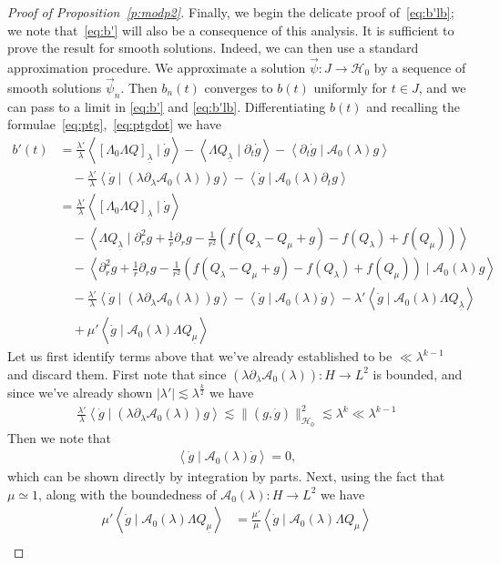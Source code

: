 \documentclass[10pt,reqno]{amsart}
\newcommand{\A}{\mathcal{A}}
\newcommand{\B}{\mathcal{B}}
\newcommand{\HH}{\mathcal{H}}
\newcommand{\la}{\lambda}
\newcommand{\La}{\Lambda}
\newcommand{\p}{\partial}
\newcommand{\ang}[1]{\left\langle{#1}\right\rangle}
\newcommand{\abs}[1]{\left\lvert{#1}\right\rvert}
\newcommand{\EQ}[1]{\begin{equation}\begin{split} #1 \end{split}\end{equation}}
\numberwithin{equation}{section}
\theoremstyle{remark}
\newcounter{parts}
\newcommand{\ula}{\underline{\lambda}}
\newcommand{\umu}{\underline{\mu}}
\newcommand{\0}{\emptyset}
\begin{document}
\begin{proof}[Proof of Proposition~\ref{p:modp2}]
Finally, we  begin the delicate proof of~\eqref{eq:b'lb}; we note that~\eqref{eq:b'} will also be a consequence of this analysis. It is sufficient to prove the result for smooth solutions.
Indeed, we can then use a standard approximation procedure.
We approximate a solution $\vec\psi:J\to \HH_0$ by a sequence of smooth solutions $\vec\psi_n$.
Then $b_n(t)$ converges to $b(t)$ uniformly for $t\in J$, and we can pass to a limit in \eqref{eq:b'} and \eqref{eq:b'lb}. Differentiating $b(t)$ and recalling the formulae~\eqref{eq:ptg},~\eqref{eq:ptgdot} we have 
\EQ{ \label{eq:b'1} 
b'(t) &= \frac{\la'}{\la} \ang{[ \La_0 \La Q]_{\ula} \mid \dot g }   - \ang{ \La Q_{\ula}  \mid \p_t \dot g} 
 - \ang{\p_t  \dot g \mid \A_0( \la) g}  \\ 
& \quad - \frac{\la'}{\la}\ang{ \dot g \mid  (\la \p_\la \A_0(\la)) g}  -  \ang{ \dot g \mid \A_0(\la) \p_t g} \\ 
& = \frac{\la'}{\la} \ang{[ \La_0 \La Q]_{\ula} \mid \dot g }   \\
 &\quad -  \ang{ \La Q_{\ula} \mid  \p_r^2 g + \frac{1}{r} \p_r g  - \frac{1}{r^2} \left( f( Q_\la - Q_\mu + g) - f(Q_\la) +f(Q_\mu)\right)} \\
& \quad - \ang{ \p_r^2 g + \frac{1}{r} \p_r g  - \frac{1}{r^2} \left( f( Q_\la - Q_\mu + g) - f(Q_\la) + f(Q_\mu)\right) \mid \A_0(\la) g}  \\
& \quad - \frac{\la'}{\la}\ang{ \dot g \mid  (\la \p_\la \A_0(\la)) g} - \ang{ \dot g \mid \A_0(\la) \dot g} -  \la' \ang{ \dot g \mid \A_0(\la) \La Q_{\ula}} \\
&\quad + \mu' \ang{ \dot g \mid \A_0(\la) \La Q_{\umu}}
}
Let us first identify terms above that we've already established to be $\ll \la^{k-1}$ and discard them. 
First note that since $(\la \p_\la \A_0(\la)): H \to L^2$ is bounded, and since we've already shown $\abs{\la'} \lesssim \la^{\frac{k}{2}}$ we have 
\EQ{
\frac{\la'}{\la}\ang{ \dot g \mid  (\la \p_\la \A_0(\la)) g} \lesssim  \|(g, \dot g) \|_{\HH_0}^2 \lesssim \la^k \ll \la^{k-1}
}
Then we note that 
\EQ{
\ang{ \dot g \mid \A_0(\la) \dot g} = 0, 
}
which can be shown directly by integration by parts. 
Next, using the fact that $\mu   \simeq1$, along with the boundedness of $\A_0(\la): H \to L^2$  we have 
\EQ{
\mu' \ang{ \dot g \mid \A_0(\la) \La Q_{\umu}} &= \frac{\mu'}{\mu} \ang{ \dot g \mid \A_0(\la) \La Q_{\mu}} \\
}
\end{proof}
\end{document}
